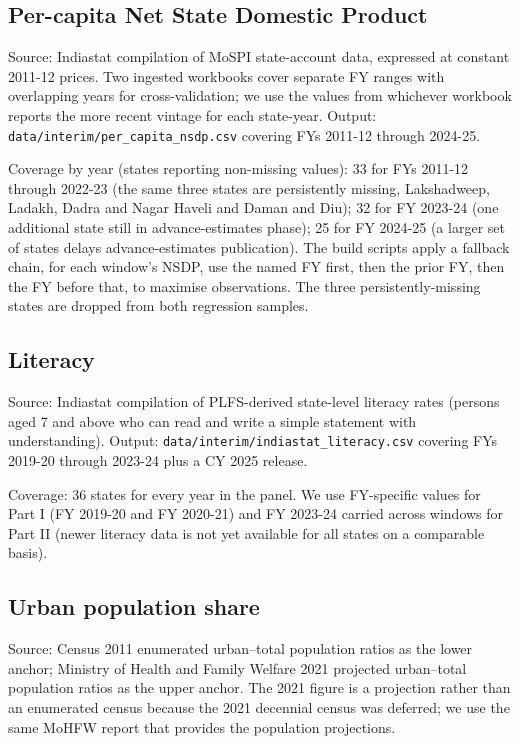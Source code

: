 \documentclass[
]{article}
\begin{document}
\subsection{Per-capita Net State Domestic
Product}\label{per-capita-net-state-domestic-product}

Source: Indiastat compilation of MoSPI state-account data, expressed at
constant 2011-12 prices. Two ingested workbooks cover separate FY ranges
with overlapping years for cross-validation; we use the values from
whichever workbook reports the more recent vintage for each state-year.
Output: \texttt{data/interim/per\_capita\_nsdp.csv} covering FYs 2011-12
through 2024-25.

Coverage by year (states reporting non-missing values): 33 for FYs
2011-12 through 2022-23 (the same three states are persistently missing,
Lakshadweep, Ladakh, Dadra and Nagar Haveli and Daman and Diu); 32 for
FY 2023-24 (one additional state still in advance-estimates phase); 25
for FY 2024-25 (a larger set of states delays advance-estimates
publication). The build scripts apply a fallback chain, for each
window's NSDP, use the named FY first, then the prior FY, then the FY
before that, to maximise observations. The three persistently-missing
states are dropped from both regression samples.

\subsection{Literacy}\label{literacy}

Source: Indiastat compilation of PLFS-derived state-level literacy rates
(persons aged 7 and above who can read and write a simple statement with
understanding). Output: \texttt{data/interim/indiastat\_literacy.csv}
covering FYs 2019-20 through 2023-24 plus a CY 2025 release.

Coverage: 36 states for every year in the panel. We use FY-specific
values for Part I (FY 2019-20 and FY 2020-21) and FY 2023-24 carried
across windows for Part II (newer literacy data is not yet available for
all states on a comparable basis).

\subsection{Urban population share}\label{urban-population-share}

Source: Census 2011 enumerated urban--total population ratios as the
lower anchor; Ministry of Health and Family Welfare 2021 projected
urban--total population ratios as the upper anchor. The 2021 figure is a
projection rather than an enumerated census because the 2021 decennial
census was deferred; we use the same MoHFW report that provides the
population projections.
\end{document}
